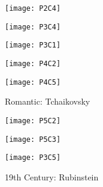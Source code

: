 \begin{figure}[h]
\begin{minipage}{.5\textwidth}
  \centering
  \texttt{[image: P2C4]}
  \label{fig:test2}
\end{minipage}
\end{figure}

\begin{figure}[h]
\begin{minipage}{.5\textwidth}
  \centering
  \texttt{[image: P3C4]}
  \label{fig:test2}
\end{minipage}
\begin{minipage}{.5\textwidth}
  \centering
  \texttt{[image: P3C1]}
  \label{fig:test1}
\end{minipage}
\end{figure}

\begin{figure}[h]
\begin{minipage}{.5\textwidth}
  \centering
  \texttt{[image: P4C2]}
  \label{fig:test2}
\end{minipage}
\begin{minipage}{.5\textwidth}
\caption{Romantic: Tchaikovsky}
\centering
\texttt{[image: P4C5]}
 \label{fig:test3}
\end{minipage}
\end{figure}

\begin{figure}[h]
\begin{minipage}{.5\textwidth}
  \centering
  \texttt{[image: P5C2]}
  \label{fig:test2}
\end{minipage}
\begin{minipage}{.5\textwidth}
  \centering
  \texttt{[image: P5C3]}
  \label{fig:test1}
\end{minipage}
\end{figure}

\begin{figure}[h]
\caption{19th Century: Rubinstein}
\centering
\texttt{[image: P3C5]}
\end{figure}